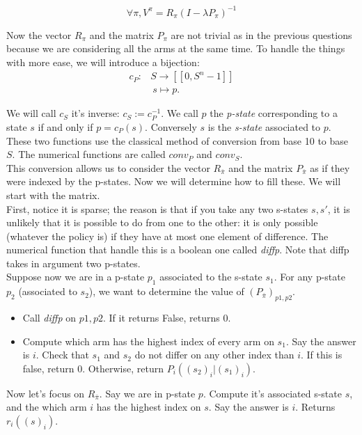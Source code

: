 \documentclass[12pt]{article}
\begin{document}
 $$\forall \pi, V^{\pi} = R_{\pi}(I - \lambda P_{\pi})^{-1}  $$

Now the vector $R_{\pi}$ and the matrix $P_{\pi}$ are not trivial as in the previous questions because we are considering all the arms at the same time. To handle the things with more ease, we will introduce a bijection:
\begin{align*}
    c_P \colon &S \to [[0, S^n-1]]\\
    &\ s \mapsto p.
\end{align*}

We will call $c_S$ it's inverse: $c_S := c_P^{-1}$. We call $p$ the \textit{p-state} corresponding to a state $s$ if and only if $p = c_P(s)$. Conversely $s$ is the \textit{s-state} associated to $p$.\\
These two functions use the classical method of conversion from base 10 to base $S$. The numerical functions are called $conv_P$ and $conv_S$. \\

This conversion allows us to consider the vector $R_{\bar{\pi}}$ and the matrix $P_{\bar{\pi}}$ as if they were indexed by the p-states. Now we will determine how to fill these. We will start with the matrix. \\
First, notice it is sparse; the reason is that if you take any two s-states $s, s'$, it is unlikely that it is possible to do from one to the other: it is only possible (whatever the policy is) if they have at most one element of difference. The numerical function that handle this is a boolean one called \textit{diffp}. Note that diffp takes in argument two p-states. \\
Suppose now we are in a p-state $p_1$ associated to the s-state $s_1$. For any p-state $p_2$ (associated to $s_2$), we want to determine the value of $(P_{\bar{\pi}})_{p1, p2}$. 
\begin{itemize}
    \item Call \textit{diffp} on $p1, p2$. If it returns False, returns 0.
    \item Compute which arm has the highest index of every arm on $s_1$. Say the answer is $i$. Check that $s_1$ and $s_2$ do not differ on any other index than $i$. If this is false, return 0. Otherwise, return $P_i((s_2)_i | (s_1)_i )$. 
\end{itemize}

Now let's focus on $R_{\bar{\pi}}$. Say we are in p-state $p$. Compute it's associated s-state $s$, and the which arm $i$ has the highest index on $s$. Say the answer is $i$. Returns $r_i((s)_i)$. 
\end{document}
